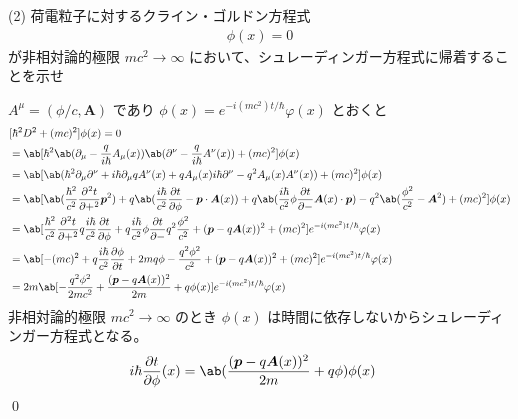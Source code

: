\documentclass[uplatex,dvipdfmx,a4paper,11pt]{jlreq}
\makeatletter
\newcommand{\pp}{\bm{p}}
\numberwithin{equation}{section}
\theoremstyle{definition}
\renewenvironment{proof}[1][\proofname]{\par
  \normalfont
  \topsep6\p@\@plus6\p@ \trivlist
  \item[\hskip\labelsep{\bfseries #1}\@addpunct{\bfseries}]\ignorespaces\quad\par
}{%
  \qed\endtrivlist\@endpefalse
}
\renewcommand\proofname{証明}
\makeatother
\begin{document}
(2) 荷電粒子に対するクライン・ゴルドン方程式
\begin{align}
  [\hbar^2D^2 + (mc)^2]\phi(x) = 0
\end{align}
が非相対論的極限 $mc^2\to\infty$ において、シュレーディンガー方程式に帰着することを示せ
\begin{proof}
  $A^\mu = (\phi/c, \bm{A})$ であり $\phi(x) = e^{-i(mc^2)t/\hbar}\varphi(x)$ とおくと
  \begin{align}
     & [\hbar^2D^2 + (mc)^2]\phi(x) = 0                                                                                                                                                                                                    \\
     & = \ab[\hbar^2\ab(\partial_\mu - \frac{q}{i\hbar}A_\mu(x))\ab(\partial^\nu - \frac{q}{i\hbar}A^\nu(x)) + (mc)^2]\phi(x)                                                                                                              \\
     & = \ab[\ab(\hbar^2\partial_\mu\partial^\nu + i\hbar\partial_\mu qA^\nu(x)  + qA_\mu(x)i\hbar\partial^\nu - q^2A_\mu(x)A^\nu(x)) + (mc)^2]\phi(x)                                                                                     \\
     & = \ab[\ab(\frac{\hbar^2}{c^2}\diffp[2]{t} + \pp^2) + q\ab(\frac{i\hbar}{c^2}\diffp{t}\phi - \pp\cdot\bm{A}(x)) + q\ab(\frac{i\hbar}{c^2}\phi\diffp{t} - \bm{A}(x)\cdot\pp) - q^2\ab(\frac{\phi^2}{c^2} - \bm{A}^2) + (mc)^2]\phi(x) \\
     & = \ab[\frac{\hbar^2}{c^2}\diffp[2]{t} + q\frac{i\hbar}{c^2}\diffp{t}\phi + q\frac{i\hbar}{c^2}\phi\diffp{t} - q^2\frac{\phi^2}{c^2} + (\pp - q\bm{A}(x))^2 + (mc)^2]e^{-i(mc^2)t/\hbar}\varphi(x)                                   \\
     & = \ab[-(mc)^2 + q\frac{i\hbar}{c^2}\diffp{\phi}{t} + 2mq\phi - \frac{q^2\phi^2}{c^2} + (\pp - q\bm{A}(x))^2 + (mc)^2]e^{-i(mc^2)t/\hbar}\varphi(x)                                                                                  \\
     & = 2m\ab[-\frac{q^2\phi^2}{2mc^2} + \frac{(\pp - q\bm{A}(x))^2}{2m} + q\phi(x)]e^{-i(mc^2)t/\hbar}\varphi(x)
  \end{align}
  非相対論的極限 $mc^2\to\infty$ のとき $\phi(x)$ は時間に依存しないからシュレーディンガー方程式となる。
  \begin{align}
    i\hbar\diffp{t}\phi(x) & = \ab(\frac{(\pp - q\bm{A}(x))^2}{2m} + q\phi)\phi(x)
  \end{align}
\end{proof}
\end{document}
